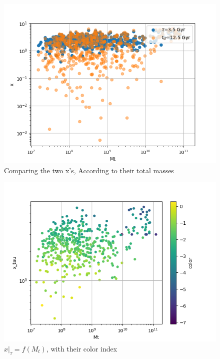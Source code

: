 \documentclass[a4paper,twocolumn]{article}
\begin{document}
\begin{figure}[!htpb]
\centering
\includegraphics[width=.9\linewidth]{./figs/Comparing_the_x_Mt.png}
\caption{\label{fig:Comparing the two x's, According to their total masses}Comparing the two x's, According to their total masses}
\end{figure}
\begin{figure}[!htpb]
\centering
\includegraphics[width=.9\linewidth]{./figs/x_tau-Mt-color.png}
\caption{\label{fig:$x|_\tau=f(M_t)$, with their color index}\(x|_\tau=f(M_t)\), with their color index}
\end{figure}
\end{document}
